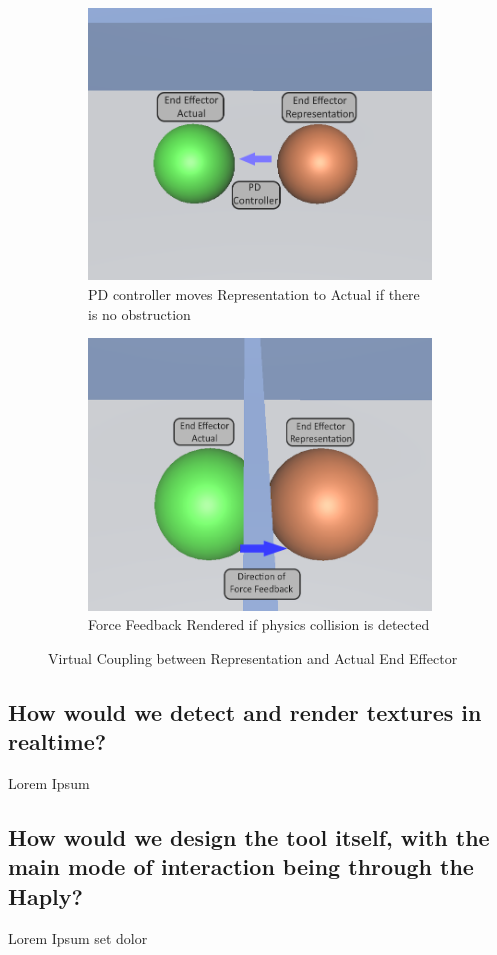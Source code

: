 \begin{figure}[htbp]
    \centering
    \begin{subfigure}[b]{0.4\textwidth}
        \centering
        \includegraphics[width=\textwidth]{images/approach-virtual-coupling-a.png}
        \caption{PD controller moves Representation to Actual if there is no obstruction}
        \label{fig:virtual-coupling-a}
    \end{subfigure}
    \quad
    \quad
    \begin{subfigure}[b]{0.4\textwidth}
        \centering
        \includegraphics[width=\textwidth]{images/approach-virtual-coupling-b.png}
        \caption{Force Feedback Rendered if physics collision is detected}
        \label{fig:virtual-coupling-b}
    \end{subfigure}
    \caption{Virtual Coupling between Representation and Actual End Effector}
    \label{fig:virtual-coupling}
\end{figure}


\subsection{How would we detect and render textures in realtime?}

Lorem Ipsum

\subsection{How would we design the tool itself, with the main mode of interaction being through the Haply?}

Lorem Ipsum set dolor 
